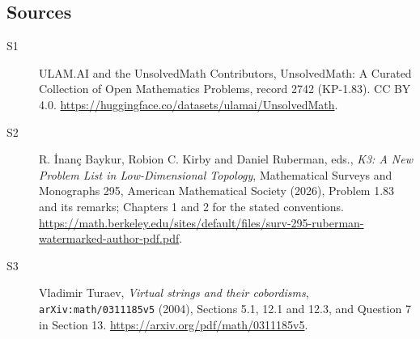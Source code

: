 \documentclass[11pt]{article}
\begin{document}
\subsection{Sources}
\begin{description}
\item[\hypertarget{source:2742:1}{S1}] ULAM.AI and the UnsolvedMath Contributors, UnsolvedMath: A Curated Collection of Open Mathematics Problems, record 2742 (KP-1.83). CC BY 4.0. \url{https://huggingface.co/datasets/ulamai/UnsolvedMath}.
\item[\hypertarget{source:2742:2}{S2}] R. İnanç Baykur, Robion C. Kirby and Daniel Ruberman, eds., \emph{K3: A New Problem List in Low-Dimensional Topology}, Mathematical Surveys and Monographs 295, American Mathematical Society (2026), Problem 1.83 and its remarks; Chapters 1 and 2 for the stated conventions. \url{https://math.berkeley.edu/sites/default/files/surv-295-ruberman-watermarked-author-pdf.pdf}.
\item[\hypertarget{source:2742:3}{S3}] Vladimir Turaev, \emph{Virtual strings and their cobordisms}, \nolinkurl{arXiv:math/0311185v5} (2004), Sections 5.1, 12.1 and 12.3, and Question 7 in Section 13. \url{https://arxiv.org/pdf/math/0311185v5}.
\end{description}
\label{end:2742}
\end{document}
